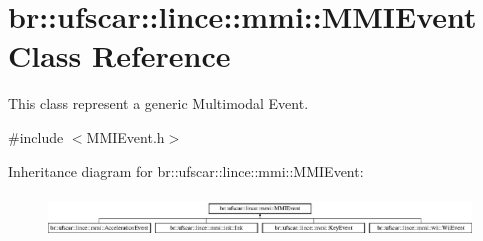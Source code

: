 \hypertarget{classbr_1_1ufscar_1_1lince_1_1mmi_1_1MMIEvent}{
\section{br::ufscar::lince::mmi::MMIEvent Class Reference}
\label{classbr_1_1ufscar_1_1lince_1_1mmi_1_1MMIEvent}
}


This class represent a generic Multimodal Event.  




{\ttfamily \#include $<$MMIEvent.h$>$}

Inheritance diagram for br::ufscar::lince::mmi::MMIEvent:\begin{figure}[H]
\begin{center}
\leavevmode
\includegraphics[height=1.14754cm]{classbr_1_1ufscar_1_1lince_1_1mmi_1_1MMIEvent}
\end{center}
\end{figure}

